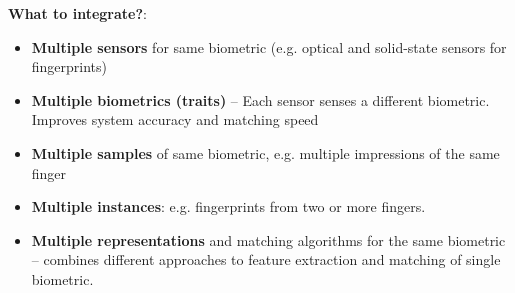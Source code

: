 \documentclass[a4paper]{article}
\begin{document}
      \textbf{What to integrate?}:
        \begin{itemize}
          \item \textbf{Multiple sensors} for same biometric (e.g. optical and solid-state sensors for fingerprints)
          \item \textbf{Multiple biometrics (traits)} -- Each sensor senses a different biometric. Improves system accuracy and matching speed
          \item \textbf{Multiple samples} of same biometric, e.g. multiple impressions of the same finger
          \item \textbf{Multiple instances}: e.g. fingerprints from two or more fingers.
          \item \textbf{Multiple representations} and matching algorithms for the same biometric -- combines different approaches to feature extraction and matching of single biometric.
        \end{itemize}
\end{document}

